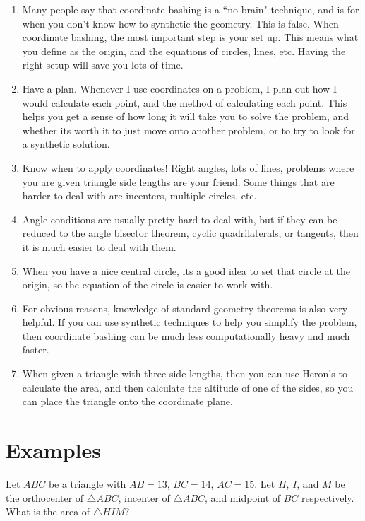 \documentclass[mast]{lucky}
\begin{document}
\begin{enumerate}
    \item Many people say that coordinate bashing is a ``no brain" technique, and is for when you don't know how to synthetic the geometry. This is false. When coordinate bashing, the most important step is your set up. This means what you define as the origin, and the equations of circles, lines, etc. Having the right setup will save you lots of time.
    \item Have a plan. Whenever I use coordinates on a problem, I plan out how I would calculate each point, and the method of calculating each point. This helps you get a sense of how long it will take you to solve the problem, and whether its worth it to just move onto another problem, or to try to look for a synthetic solution. 
    \item Know when to apply coordinates! Right angles, lots of lines, problems where you are given triangle side lengths are your friend. Some things that are harder to deal with are incenters, multiple circles, etc.
    \item Angle conditions are usually pretty hard to deal with, but if they can be reduced to the angle bisector theorem, cyclic quadrilaterals, or tangents, then it is much easier to deal with them. 
    \item When you have a nice central circle, its a good idea to set that circle at the origin, so the equation of the circle is easier to work with.
    \item For obvious reasons, knowledge of standard geometry theorems is also very helpful. If you can use synthetic techniques to help you simplify the problem, then coordinate bashing can be much less computationally heavy and much faster. 
    \item When given a triangle with three side lengths, then you can use Heron's to calculate the area, and then calculate the altitude of one of the sides, so you can place the triangle onto the coordinate plane. 
\end{enumerate}

\section{Examples}

\begin{exam}
Let $ABC$ be a triangle with $AB=13$, $BC=14$, $AC=15$. Let $H$, $I$, and $M$ be the orthocenter of $\triangle ABC$, incenter of $\triangle ABC$, and midpoint of $BC$ respectively. What is the area of $\triangle HIM$?
\end{exam}
\end{document}

